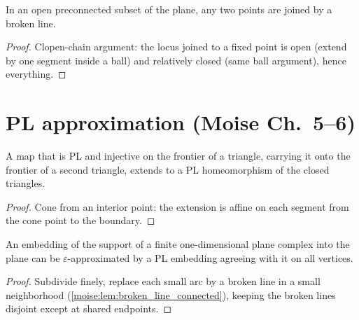 \begin{lemma}
\label{moise:lem:broken_line_connected}
\leanok
{}
In an open preconnected subset of the plane, any two points are joined by a
broken line.
\end{lemma}

\begin{proof}
\leanok
Clopen-chain argument: the locus joined to a fixed point is open (extend by one
segment inside a ball) and relatively closed (same ball argument), hence
everything.
\end{proof}

\section{PL approximation (Moise Ch.~5--6)}

\begin{theorem}
\label{moise:thm:cone_extension}
\leanok
{}
A map that is PL and injective on the frontier of a triangle, carrying it onto
the frontier of a second triangle, extends to a PL homeomorphism of the closed
triangles.
\end{theorem}

\begin{proof}
\leanok
Cone from an interior point: the extension is affine on each segment from the
cone point to the boundary.
\end{proof}

\begin{theorem}
\label{moise:thm:one_skeleton_approx}
\leanok
{}
An embedding of the support of a finite one-dimensional plane complex into the
plane can be $\varepsilon$-approximated by a PL embedding agreeing with it on
all vertices.
\end{theorem}

\begin{proof}
\leanok
Subdivide finely, replace each small arc by a broken line in a small
neighborhood (\ref{moise:lem:broken_line_connected}), keeping the broken lines
disjoint except at shared endpoints.
\end{proof}


